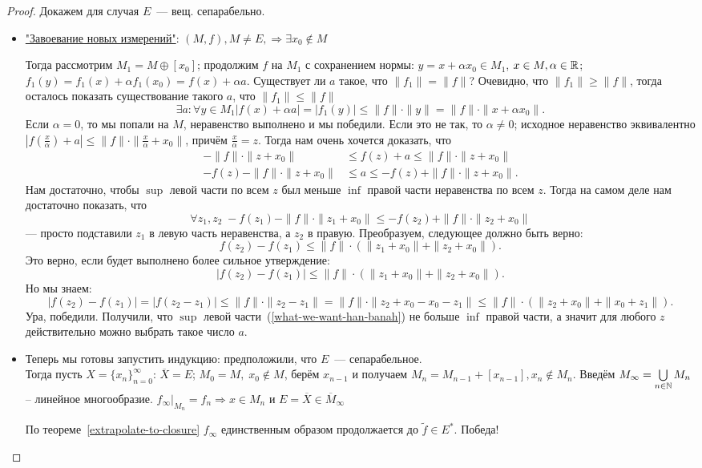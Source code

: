 \begin{proof} Докажем для случая $E$~--- вещ. сепарабельно. 
\begin{itemize}
    \item [Шаг 1.] \href{https://vk.com/audio2000232946_456244622}{"Завоевание новых измерений"}: $(M, f), M \neq E, \Rightarrow \exists x_0 \notin M$

Тогда рассмотрим $M_1 = M \oplus [x_0]$; продолжим $f$ на $M_1$ с сохранением нормы: $y = x + \alpha x_0 \in M_1$, $x \in M, \alpha \in \mathbb{R}$; $f_1(y) = f_1(x) + \alpha f_1(x_0) = f(x) + \alpha a$. Существует ли $a$ такое, что $\|f_1\| = \|f\|$? Очевидно, что $\|f_1\| \geqslant \|f\|$, тогда осталось показать существование такого \(a\), что $\|f_1\| \leqslant \|f\|$
\[\exists a: \forall y \in M_1 |f(x) + \alpha a | = |f_1(y)| \leqslant \|f\| \cdot \|y\| = \|f\| \cdot \| x + \alpha x_0\|.\] Если $\alpha = 0$, то мы попали на $M$, неравенство выполнено и мы победили. Если это не так, то $\alpha \neq 0$; исходное неравенство эквивалентно $|f(\frac{x}{\alpha}) + a| \leqslant \|f\| \cdot \| \frac{x}{\alpha} + x_0 \| $, причём $\frac{x}{\alpha} = z$. Тогда нам очень хочется доказать, что
\begin{align}
    - \|f \| \cdot \| z + x_0 \| &\leqslant f(z) + a \leqslant \| f \| \cdot \| z + x_0 \|\\
- f(z) - \|f \| \cdot \| z + x_0 \| &\leqslant a \leqslant - f(z) + \| f \| \cdot \| z + x_0 \|.
\label{what-we-want-han-banah}
\end{align}
Нам достаточно, чтобы $\sup$ левой части по всем $z$ был меньше $\inf$ правой части неравенства по всем $z$. Тогда на самом деле нам достаточно показать, что
\[\forall z_1, z_2\; -f(z_1) - \|f \| \cdot \| z_1 + x_0 \| \leqslant - f(z_2) + \| f \| \cdot \| z_2 + x_0 \| \]--- просто подставили $z_1$ в левую часть неравенства, а $z_2$ в правую. Преобразуем, следующее должно быть верно:
\[f(z_2) - f(z_1) \leqslant \|f\| \cdot (\| z_1 + x_0 \| + \| z_2 + x_0 \|).\]
Это верно, если будет выполнено более сильное утверждение:
\[|f(z_2) - f(z_1)| \leqslant \|f\| \cdot (\| z_1 + x_0 \| + \| z_2 + x_0 \|).\]
Но мы знаем:
\[|f(z_2) - f(z_1)| = |f(z_2 - z_1)| \leqslant \|f\| \cdot \| z_2 - z_1 \| = \|f\| \cdot \| z_2 + x_0 - x_0 - z_1 \| \leqslant \|f\| \cdot (\| z_2 + x_0 \| + \| x_0 + z_1 \| ).\]
Ура, победили. Получили, что $\sup$ левой части~(\ref{what-we-want-han-banah}) не больше $\inf$ правой части, а значит для любого $z$ действительно можно выбрать такое число $a$.
 \item [Шаг 2.] Теперь мы готовы запустить индукцию: предположили, что $E$~--- сепарабельное. \\
 Тогда пусть $X = \{ x_n \}_{n=0}^{\infty}$: $\overline{X} = E$; $M_0 = M,\; x_0 \notin M$, берём $x_{n-1}$ и получаем $M_n = M_{n-1} + [x_{n-1}], x_n \notin M_n $. Введём $M_{\infty} = \bigcup\limits_{n \in \mathbb{N}} M_n$ -- линейное многообразие. $f_{\infty} | _{M_n} = f_n \Rightarrow x \in M_n $ и $E = \overline{X} \in \overline{M}_{\infty}$

По теореме~\ref{extrapolate-to-closure} $f_{\infty}$ единственным образом продолжается до $\widetilde{f} \in E^*$. Победа!
\end{itemize}
\end{proof}

